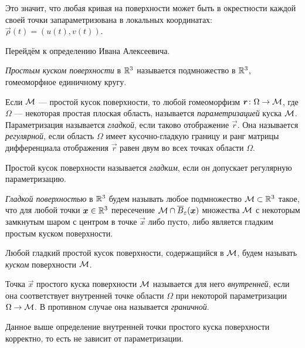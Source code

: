 Это значит, что любая кривая на поверхности может быть в окрестности каждой своей точки запараметризована в локальных координатах: $\vec{\rho}(t) = (u(t), v(t))$.

Перейдём к определению Ивана Алексеевича.

\begin{definition}
	\textit{Простым куском поверхности} в $\mathbb{R}^3$ называется подмножество в $\mathbb{R}^3$, гомеоморфное единичному кругу.
\end{definition}

\begin{definition}
	Если $\mathcal{M}$ --- простой кусок поверхности, то любой гомеоморфизм $\boldsymbol{r}\colon \Omega \to \mathcal{M}$, где $\Omega$ --- некоторая простая плоская область, называется \textit{параметризацией} куска $\mathcal{M}$. Параметризация называется \textit{гладкой}, если таково отображение $\vec{r}$. Она называется \textit{регулярной}, если область $\Omega$ имеет кусочно-гладкую границу и ранг матрицы дифференциала отображения $\vec{r}$ равен двум во всех точках области $\Omega$.
\end{definition}

\begin{definition}
	Простой кусок поверхности называется \textit{гладким}, если он допускает регулярную параметризацию.

	\textit{Гладкой поверхностью} в $\mathbb{R}^3$ будем называть любое подмножество $\mathcal{M} \subset \mathbb{R}^3$ такое, что для любой точки $\boldsymbol{x} \in \mathbb{R}^3$ пересечение $\mathcal{M} \cap \overline{B}_\varepsilon(\boldsymbol{x})$ множества $\mathcal{M}$ с некоторым замкнутым шаром с центром в точке $\vec{x}$ либо пусто, либо является гладким простым куском поверхности.

	Любой гладкий простой кусок поверхности, содержащийся в $\mathcal{M}$, будем называть \textit{куском} поверхности $\mathcal{M}$.
\end{definition}

\begin{definition}
	Точка $\vec{x}$ простого куска поверхности $\mathcal{M}$ называется для него \textit{внутренней}, если она соответствует внутренней точке области $\Omega$ при некоторой параметризации $\Omega \to \mathcal{M}$. В противном случае она называется \textit{граничной}.
\end{definition}

\begin{proposition}
	Данное выше определение внутренней точки простого куска поверхности корректно, то есть не зависит от параметризации.
\end{proposition}

